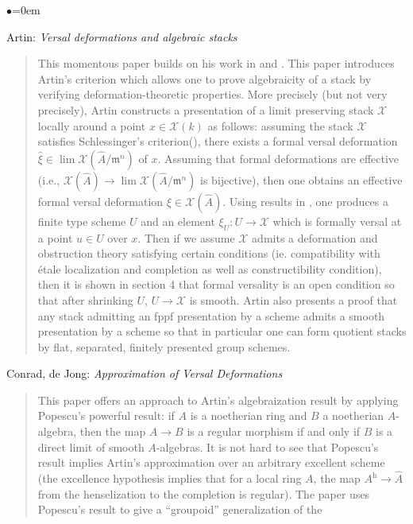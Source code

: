 \begin{list}{$\bullet$}{\leftmargin=0em}
\item
Artin: \emph{Versal deformations and algebraic stacks} \cite{artin_versal}
\begin{quote}
This momentous paper builds on his work in 
\cite{artin_approximation} and \cite{artin_algebraizationI}. This paper 
introduces Artin's criterion which allows one to prove algebraicity of a
stack by  verifying deformation-theoretic properties. More precisely (but
not very  precisely), Artin constructs a presentation of a limit preserving
stack  $\mathcal{X}$ 
locally around a point $x \in \mathcal{X}(k)$ as follows: assuming the stack 
$\mathcal{X}$ 
satisfies Schlessinger's criterion(\cite{Sch}), there exists a formal 
versal deformation
$\hat{\xi} \in \lim \mathcal{X}(\hat A / \mathfrak m^n)$ of 
$x$. Assuming  that formal deformations are effective (i.e.,
$\mathcal{X}(\hat{A}) \to \lim \mathcal{X}(\hat A  / \mathfrak m^n)$
is bijective), then one obtains an effective formal versal 
deformation $\xi \in \mathcal{X}(\hat A)$. Using results in 
\cite{artin_algebraizationI}, one produces a finite type scheme $U$ and an 
element $\xi_U: U \to \mathcal{X}$ which is formally versal at a point
$u \in U$ over $x$. Then if we assume $\mathcal{X}$ admits a deformation
and obstruction theory 
satisfying certain conditions (ie. compatibility with \'etale localization and 
completion as well as constructibility condition), then it is shown in section 
4 that formal versality is an open condition so that after shrinking $U$, $U 
\to \mathcal{X}$ is smooth.
Artin also presents a proof that any stack admitting an fppf presentation by 
a scheme admits a smooth presentation by a scheme so that in particular 
one can form quotient stacks by flat, separated, finitely presented group 
schemes.
\end{quote}
\smallskip
\item Conrad, de Jong: \emph{Approximation of Versal Deformations} 
\cite{conrad-dejong}
\begin{quote}
This paper offers an approach to Artin's algebraization result by applying 
Popescu's powerful result: if $A$ is a noetherian ring and $B$ a noetherian 
$A$-algebra, then the map $A \to B$ is a regular morphism if and only if $B$ 
is a direct limit of smooth $A$-algebras. It is not hard to see that Popescu's 
result implies Artin's approximation over an arbitrary excellent scheme (the 
excellence hypothesis implies that for a local ring $A$, the map $A^{\text{h}} 
\to \hat A$ from the henselization to the completion is regular).
The paper uses Popescu's result to give a ``groupoid'' generalization of the 

\end{quote}
\end{list}
